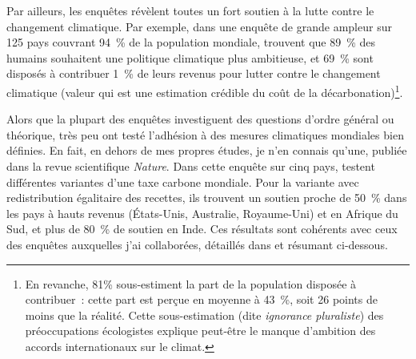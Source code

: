 \documentclass[a5paper,french]{memoir}
\begin{document}
Par ailleurs, les enquêtes révèlent toutes un fort soutien à la lutte contre le changement climatique. Par exemple, dans une enquête de grande ampleur sur 125 pays couvrant 94~\% de la population mondiale, \citet{andre_actual_2024} trouvent que 89~\% des humains souhaitent une politique climatique plus ambitieuse, et 69~\% sont disposés à contribuer 1~\% de leurs revenus pour lutter contre le changement climatique (valeur qui est une estimation crédible du coût de la décarbonation)\footnote{En revanche, 81\% sous-estiment la part de la population disposée à contribuer~: %
cette part est perçue en moyenne à 43~\%, soit 26 points de moins que la réalité. Cette sous-estimation (dite \textit{ignorance pluraliste}) des préoccupations écologistes explique peut-être le manque d'ambition des accords internationaux sur le climat.}. 

Alors que la plupart des enquêtes investiguent des questions d'ordre général ou théorique, très peu ont testé l'adhésion à des mesures climatiques mondiales bien définies. En fait, en dehors de mes propres études, je n'en connais qu'une, publiée dans la revue scientifique \textit{Nature}. Dans cette enquête sur cinq pays, \citet{carattini_how_2019} testent différentes variantes d'une taxe carbone mondiale. Pour la variante avec redistribution égalitaire des recettes, ils trouvent un soutien proche de 50~\% dans les pays à hauts revenus (États-Unis, Australie, Royaume-Uni) et en Afrique du Sud, et plus de 80~\% de soutien en Inde. Ces résultats sont cohérents avec ceux des enquêtes auxquelles j'ai collaborées, détaillés dans \citet{fabre_international_2023} et résumant ci-dessous. 
\end{document}
